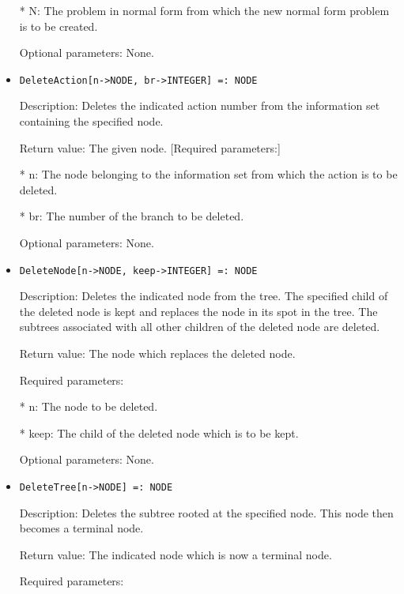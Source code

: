 \begin{itemize}
\bd
\item
[* N:] The problem in normal form from which the new normal form
problem is to be created.
\ed

\item  
[Optional parameters:] None.
\ed

\item
\begin{verbatim}
DeleteAction[n->NODE, br->INTEGER] =: NODE
\end{verbatim}

\bd
\item
[Description:] Deletes the indicated action number from the information
set containing the specified node.
\item
[Return value:] The given node.
[Required parameters:]\hfil\null
	
\bd
\item
[* n:] The node belonging to the information set from which the action
is to be deleted.
\item [* br:] The number of the branch to be deleted.
\ed

\item
[Optional parameters:] None.
\ed

\item
\begin{verbatim}
DeleteNode[n->NODE, keep->INTEGER] =: NODE
\end{verbatim}

\bd
\item   
[Description:] Deletes the indicated node from the tree.  The specified
child of the deleted node is kept and replaces the node in its spot in
the tree.  The subtrees associated with all other children of the
deleted node are deleted.
\item
[Return value:] The node which replaces the deleted node.
\item
[Required parameters:]\hfil\null
	
\bd
\item
[* n:] The node to be deleted.
\item
[* keep:] The child of the deleted node which is to be kept.
\ed

\item
[Optional parameters:] None.
\ed

\item
\begin{verbatim}
DeleteTree[n->NODE] =: NODE
\end{verbatim}

\bd
\item
[Description:] Deletes the subtree rooted at the specified node.
This node then becomes a terminal node.
\item
[Return value:] The indicated node which is now a terminal node.
\item
[Required parameters:]\hfil\null


\end{itemize}
